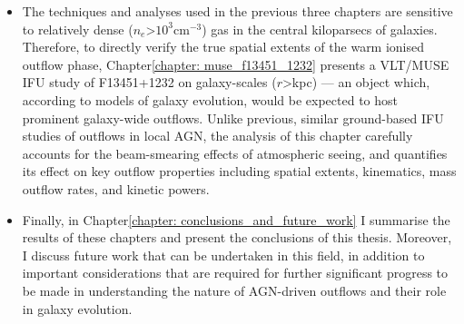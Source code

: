 \begin{itemize}
    \item The techniques and analyses used in the previous three chapters are sensitive to relatively dense ($n_e$\;\textgreater\;$10^{3}$\;cm$^{-3}$) gas in the central kiloparsecs of galaxies. Therefore, to directly verify the true spatial extents of the warm ionised outflow phase, Chapter\;\ref{chapter: muse_f13451_1232} presents a VLT/MUSE IFU study of F13451+1232 on galaxy-scales ($r$\;\textgreater{}\;kpc) --- an object which, according to models of galaxy evolution, would be expected to host prominent galaxy-wide outflows. Unlike previous, similar ground-based IFU studies of outflows in local AGN, the analysis of this chapter carefully accounts for the beam-smearing effects of atmospheric seeing, and quantifies its effect on key outflow properties including spatial extents, kinematics, mass outflow rates, and kinetic powers.
    \item Finally, in Chapter\;\ref{chapter: conclusions_and_future_work} I summarise the results of these chapters and present the conclusions of this thesis. Moreover, I discuss future work that can be undertaken in this field, in addition to important considerations that are required for further significant progress to be made in understanding the nature of AGN-driven outflows and their role in galaxy evolution.
\end{itemize}
